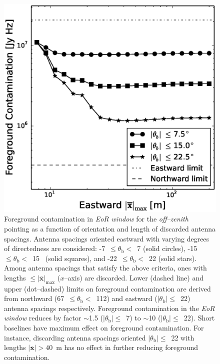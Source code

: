 \documentclass[preprint2,iop,numberedappendix]{emulateapj}
\begin{document}
\begin{figure}[htb]
\centering
\includegraphics[width=\linewidth]{figures/v1_0/baseline_screening_nside_64_Tsys_95.0K.eps}
\caption{Foreground contamination in {\it EoR window} for the {\it off--zenith} pointing as a function of orientation and length of discarded antenna spacings. Antenna spacings oriented eastward with varying degrees of directedness are considered: -7~$\le\theta_\textrm{b}<$~7 (solid circles), -15\arcdeg~$\le\theta_\textrm{b}<$~15\arcdeg~ (solid squares), and -22~$\le\theta_\textrm{b}<$~22 (solid stars). Among antenna spacings that satisfy the above criteria, ones with lengths $\le |\overline{\mathbf{x}}|_\textrm{max}$ ($x$--axis) are discarded. Lower (dashed line) and upper (dot--dashed) limits on foreground contamination are derived from northward (67~$\le\theta_\textrm{b}<$~112) and eastward ($|\theta_\textrm{b}|\le$~22) antenna spacings respectively. Foreground contamination in the {\it EoR window} reduces by factor $\sim$1.5 ($|\theta_\textrm{b}|\le$~7) to $\sim$10 ($|\theta_\textrm{b}|\le$~22). Short baselines have maximum effect on foreground contamination. For instance, discarding antenna spacings oriented $|\theta_\textrm{b}|\le$~22 with lengths $|\overline{\mathbf{x}}|>40$~m has no effect in further reducing foreground contamination. \label{fig:screening}}
\end{figure}
\end{document}
